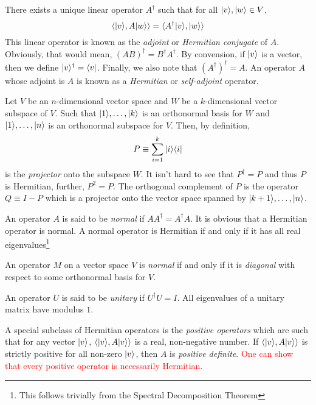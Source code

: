 There exists a unique linear operator $A^\dagger$ such that for all $|v\rangle,|w\rangle\in V$, 
\begin{equation*}
    \langle|v\rangle, A|w\rangle\rangle = \langle A^\dagger|v\rangle, |w\rangle\rangle
\end{equation*}
This linear operator is known as the \textit{adjoint} or \textit{Hermitian conjugate} of $A$. Obviously, that would mean, $(AB)^\dagger = B^\dagger A^\dagger$. By convension, if $|v\rangle$ is a vector, then we define $|v\rangle^\dagger = \langle v|$. Finally, we also note that $(A^\dagger)^\dagger = A$. An operator $A$ whose adjoint is $A$ is known as a \textit{Hermitian} or \textit{self-adjoint} operator.

Let $V$ be an $n$-dimensional vector space and $W$ be a $k$-dimensional vector subspace of $V$. Such that $|1\rangle,\ldots,|k\rangle$ is an orthonormal basis for $W$ and $|1\rangle,\ldots,|n\rangle$ is an orthonormal subspace for $V$. Then, by definition,
\begin{equation*}
    P \equiv \sum_{i=1}^k|i\rangle\langle i|
\end{equation*}
is the \textit{projector} onto the subspace $W$. It isn't hard to see that $P^\dagger = P$ and thus $P$ is Hermitian, further, $P^2 = P$. The orthogonal complement of $P$ is the operator $Q \equiv I - P$ which is a projector onto the vector space spanned by $|k + 1\rangle,\ldots,|n\rangle$.

An operator $A$ is said to be \textit{normal} if $AA^\dagger = A^\dagger A$. It is obvious that a Hermitian operator is normal. A normal operator is Hermitian if and only if it has all real eigenvalues\footnote{This follows trivially from the Spectral Decomposition Theorem}

\begin{theorem}
    An operator $M$ on a vector space $V$ is \textit{normal} if and only if it is \textit{diagonal} with respect to some orthonormal basis for $V$.
\end{theorem}

An operator $U$ is said to be \textit{unitary} if $U^\dagger U = I$. All eigenvalues of a unitary matrix have modulus $1$.

A special subclass of Hermitian operators is the \textit{positive operators} which are such that for any vector $|v\rangle$, $\langle|v\rangle,A|v\rangle\rangle$ is a real, non-negative number. If $\langle|v\rangle,A|v\rangle\rangle$ is strictly positive for all non-zero $|v\rangle$, then $A$ is \textit{positive definite}. \textcolor{red}{One can show that every positive operator is necessarily Hermitian}.


